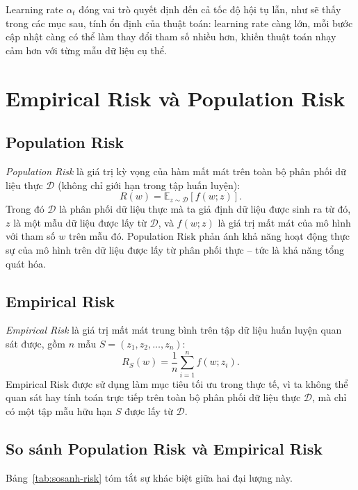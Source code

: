Learning rate $\alpha_t$ đóng vai trò quyết định đến cả tốc độ hội tụ lẫn, như sẽ thấy trong các mục sau, tính ổn định của thuật toán: learning rate càng lớn, mỗi bước cập nhật càng có thể làm thay đổi tham số nhiều hơn, khiến thuật toán nhạy cảm hơn với từng mẫu dữ liệu cụ thể.

\section{Empirical Risk và Population Risk}
\label{sec:risk}

\subsection{Population Risk}

\textit{Population Risk} là giá trị kỳ vọng của hàm mất mát trên toàn bộ phân phối dữ liệu thực $\mathcal{D}$ (không chỉ giới hạn trong tập huấn luyện):
\[
R(w) = \mathbb{E}_{z \sim \mathcal{D}}\left[f(w; z)\right].
\]
Trong đó $\mathcal{D}$ là phân phối dữ liệu thực mà ta giả định dữ liệu được sinh ra từ đó, $z$ là một mẫu dữ liệu được lấy từ $\mathcal{D}$, và $f(w; z)$ là giá trị mất mát của mô hình với tham số $w$ trên mẫu đó. Population Risk phản ánh khả năng hoạt động thực sự của mô hình trên dữ liệu được lấy từ phân phối thực -- tức là khả năng tổng quát hóa.

\subsection{Empirical Risk}

\textit{Empirical Risk} là giá trị mất mát trung bình trên tập dữ liệu huấn luyện quan sát được, gồm $n$ mẫu $S = (z_1, z_2, \ldots, z_n)$:
\[
R_S(w) = \frac{1}{n}\sum_{i=1}^{n} f(w; z_i).
\]
Empirical Risk được sử dụng làm mục tiêu tối ưu trong thực tế, vì ta không thể quan sát hay tính toán trực tiếp trên toàn bộ phân phối dữ liệu thực $\mathcal{D}$, mà chỉ có một tập mẫu hữu hạn $S$ được lấy từ $\mathcal{D}$.

\subsection{So sánh Population Risk và Empirical Risk}

Bảng~\ref{tab:sosanh-risk} tóm tắt sự khác biệt giữa hai đại lượng này.

